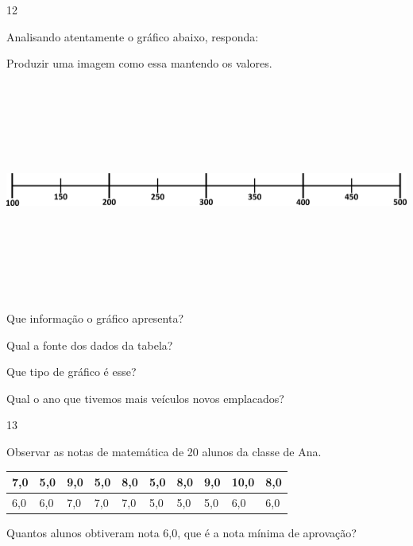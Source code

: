 \begin{escolha}
\num{12}

Analisando atentamente o gráfico abaixo, responda:

Produzir uma imagem como essa mantendo os valores.

\includegraphics[width=5.90556in,height=2.79931in]{media/image102.png}

\begin{escolha}
\item
  Que informação o gráfico apresenta?

\item
  Qual a fonte dos dados da tabela?

\item
  Que tipo de gráfico é esse?

\item
  Qual o ano que tivemos mais veículos novos emplacados?
\end{escolha}

\num{13}

Observar as notas de matemática de 20 alunos da classe de Ana.

\begin{longtable}[]{@{}llllllllll@{}}
\toprule
7,0 & 5,0 & 9,0 & 5,0 & 8,0 & 5,0 & 8,0 & 9,0 & 10,0 &
8,0\tabularnewline
\midrule
\endhead
6,0 & 6,0 & 7,0 & 7,0 & 7,0 & 5,0 & 5,0 & 5,0 & 6,0 & 6,0\tabularnewline
\bottomrule
\end{longtable}

\begin{escolha}
\item
  Quantos alunos obtiveram nota 6,0, que é a nota mínima de aprovação?


\end{escolha}
\end{escolha}
